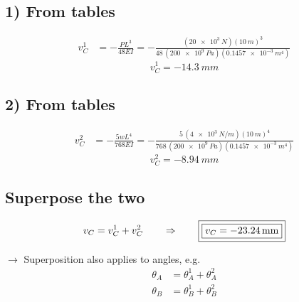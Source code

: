 \documentclass[11pt]{article}
\begin{document}
\subsection*{1) From tables}

\begin{align*}
  v_C^{1} &= -\frac{PL^3}{48EI}
           = -\frac{(\SI{20e3}{N})(\SI{10}{m})^3}{48\,(\SI{200e9}{Pa})(\SI{0.1457e-3}{m^4})}
\end{align*}
\[
  \boxed{v_C^{1} = -\SI{14.3}{mm}}
\]

\subsection*{2) From tables}

\begin{align*}
  v_C^{2} &= -\frac{5wL^4}{768EI}
           = -\frac{5\,(\SI{4e3}{N/m})(\SI{10}{m})^4}{768\,(\SI{200e9}{Pa})(\SI{0.1457e-3}{m^4})}
\end{align*}
\[
  \boxed{v_C^{2} = -\SI{8.94}{mm}}
\]

\subsection*{Superpose the two}

\[
  v_C = v_C^{1} + v_C^{2}
  \qquad\Rightarrow\qquad
  \fbox{\fbox{$v_C = -\SI{23.24}{mm}$}}
\]

\noindent
$\rightarrow$ Superposition also applies to angles, e.g.
\begin{align*}
  \theta_A &= \theta_A^{1} + \theta_A^{2} \\
  \theta_B &= \theta_B^{1} + \theta_B^{2}
\end{align*}
\end{document}
